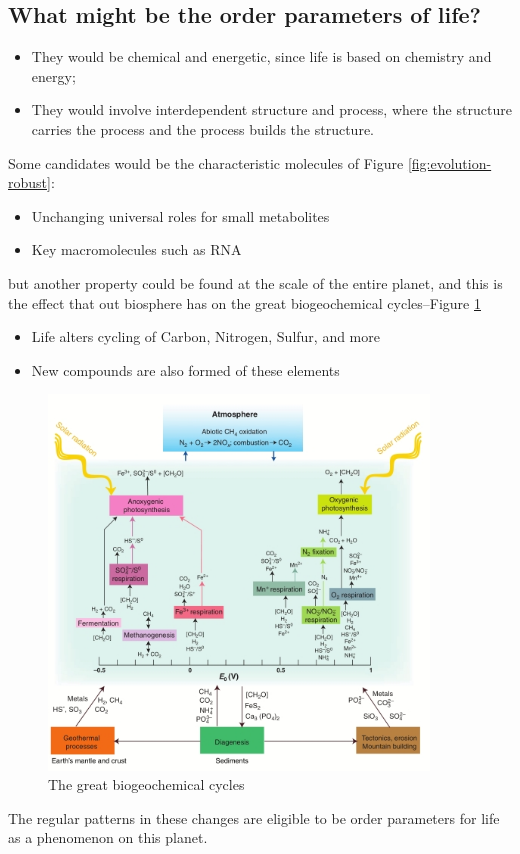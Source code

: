 \documentclass[]{article}
\begin{document}
\subsection{What might be the order parameters of life?}

\begin{itemize}
	\item They would be chemical and energetic, since life is based on chemistry and energy;
	\item They would involve interdependent	structure and process, where the structure carries the process and the process builds the structure.
\end{itemize}

Some candidates would be the characteristic molecules of Figure \ref{fig:evolution-robust}:
\begin{itemize}
	\item Unchanging universal roles for small metabolites
	\item Key macromolecules such as RNA
\end{itemize}
but another property could be found at the scale of the entire planet, and this is the effect that out biosphere has on the great biogeochemical cycles--Figure \ref{fig:biogeochemical}
\begin{itemize}
	\item Life alters cycling of Carbon, Nitrogen, Sulfur, and more
	\item New compounds are also formed of 	these elements
\end{itemize}

\begin{figure}[H]
	\caption[The great biogeochemical cycles]{The great biogeochemical cycles\cite{falkowski2008microbial}}\label{fig:biogeochemical} 
	\includegraphics[width=0.9\textwidth]{biogeochemical}
\end{figure}
The regular patterns in these changes are eligible to be order parameters for life as a phenomenon on this planet.
\end{document}
